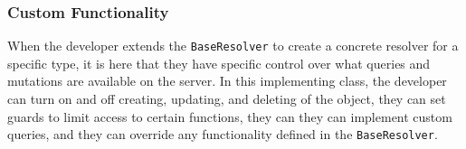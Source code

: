 \subsubsection{Custom Functionality}

When the developer extends the \verb!BaseResolver! to create a concrete resolver for a specific type, it is here that they have specific control over what queries and mutations are available on the server.  In this implementing class, the developer can turn on and off creating, updating, and deleting of the object, they can set guards to limit access to certain functions, they can they can implement custom queries, and they can override any functionality defined in the \verb!BaseResolver!.